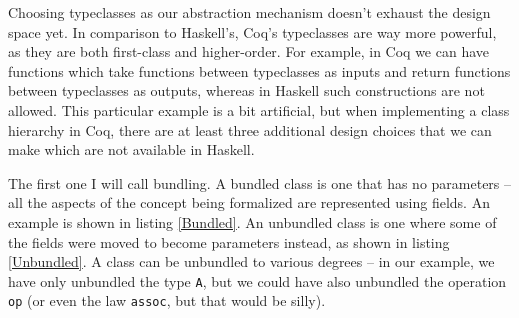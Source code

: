 \documentclass[declaration,inz,english,shortabstract]{iithesis}
\newcommand{\m}[1]{\texttt{#1}}
\begin{document}
Choosing typeclasses as our abstraction mechanism doesn't exhaust the design space yet. In comparison to Haskell's, Coq's typeclasses are way more powerful, as they are both first-class and higher-order. For example, in Coq we can have functions which take functions between typeclasses as inputs and return functions between typeclasses as outputs, whereas in Haskell such constructions are not allowed. This particular example is a bit artificial, but when implementing a class hierarchy in Coq, there are at least three additional design choices that we can make which are not available in Haskell.



The first one I will call bundling. A bundled class is one that has no parameters -- all the aspects of the concept being formalized are represented using fields. An example is shown in listing \ref{Bundled}. An unbundled class is one where some of the fields were moved to become parameters instead, as shown in listing \ref{Unbundled}. A class can be unbundled to various degrees -- in our example, we have only unbundled the type \m{A}, but we could have also unbundled the operation \m{op} (or even the law \m{assoc}, but that would be silly).
\end{document}
